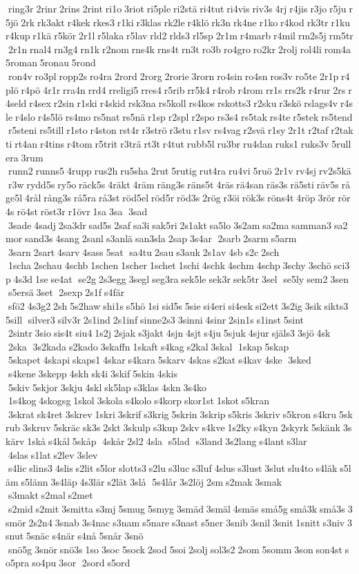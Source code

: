  ring3r 2rinr 2rins 2rint ri1o 3riot ri5ple ri2stä ri4tut ri4vis riv3s 4rj r4jis r3jo r5ju r5jö 2rk rk3akt r4kek rkes3 r1ki r3klas rk2le r4klö rk3n rk4ne r1ko r4kod rk3tr r1ku r4kup r1kä r5kör 2r1l r5laka r5lav rld2 rlds3 rl5sp 2r1m r4marb r4mil rm2s5j rm5tr 2r1n rnal4 rn3g4 rn1k r2nom rns4k rns4t rn3t ro3b ro4gro ro2kr 2rolj rol4li rom4a 5roman 5ronau 5rond  ron4v ro3pl ropp2s ro4ra 2rord 2rorg 2rorie 3rorn ro4sin ro4sn ros3v ro5te 2r1p r4plö r4pö 4r1r rra4n rrd4 rreligi5 rres4 r5rib rr5k4 r4rob r4rom rr1s rrs2k r4rur 2rs r4seld r4sex r2sin r1ski r4skid rsk3na rs5koll rs4kos rskotts3 r2sku r3skö rslags4v r4sle r4slo r4s5lö rs4mo rs5nat rs5nä r1sp r2spl r2spo rs3s4 rs5tak rs4te r5stek rs5tend r5steni rs5till r1sto r4ston rst4r r3strö r3stu r1sv rs4vag r2svä r1sy 2r1t r2taf r2takti rt4an r4tins r4tom r5trit r3trä rt3t r4tut rubb5l ru3br ru4dan ruks1 ruks3v 5rullera 3rum  runn2 runns5 4rupp rus2h ru5sha 2rut 5rutig rut4ra ru4vi 5ruö 2r1v rv4sj rv2s5kä r3w rydd5s ry5o räck5s 4räkt 4räm räng3s räns5t 4räs rä4san räs3s rä5sti räv5s råge5l 4rål rång3s rå5ra rå3st röd5el röd5r röd3s 2rög r3öi rök3s röns4t 4röp 3rör rör4s rö4st röst3r r1övr 1sa 3sa  3sad  3sade 4sadj 2sa3dr sad5s 2saf sa3i sak5ri 2s1akt sa5lo 3s2am sa2ma samman3 sa2mor sand3s 4sang 2sanl s3anlä san3sla 2sap 3s4ar  2sarb 2sarm s5arm  3sarn 2sart 4sarv 4sass 5sat  sa4tu 2sau s3auk 2s1av 4sb s2c 2sch  1scha 2schau 4schb 1schen 1scher 1schet 1schi 4schk 4schm 4schp 3schy 3schö sci3p 4s3d 1se se4at  se2g 2s3egg 3segl seg3ra sek5le sek3r sek5tr 3sel  se5ly sem2 3sen  s5ersä 3set  2sexp 2s1f s4fär  sfö2 4s3g2 2sh 5s2haw shi1s s5hö 1si sid5s 5sie si4eri si4esk si2ett 3s2ig 3sik sikts3 5sill  silver3 silv3r 2s1ind 2s1inf sinne2s3 3sinni 4sinr 2sin1s s1inst 5sint  2sintr 3sio sis4t siu4 1s2j 2sjak s3jakt 4sjn 4sjt s4ju 5sjuk 4sjur själs3 3sjö 4sk  2ska  3s2kada s2kado 3skaffn 1skaft s4kag s2kal 3skal  1skap 5skap  5skapet 4skapi skaps1 4skar s4kara 5skarv 4skas s2kat s4kav 4ske  3sked  s4kene 3skepp 4skh sk4i 3skif 5skin 4skis  5skiv 5skjor 3skju 4skl sk5lap s3klas 4skn 3s4ko  1s4kog 4skogsg 1skol 3skola s4kolo s4korp skor1st 1skot s5kran  3skrat sk4ret 3skrev 1skri 3skrif s3krig 5skrin 3skrip s5kris 3skriv s5kron s4kru 5skrub 3skruv 5skräc sk3s 2skt 3skulp s3kup 2skv s4kve 1s2ky s4kyn 2skyrk 5skänk 3skärv 1skå s4kål 5skåp  4skår 2sl2 4sla  s5lad  s3land 3s2lang s4lant s3lar  4slas s1lat s2lev 3slev  s4lic slins3 4slis s2lit s5lor slotts3 s2lu s3luc s3luf 4slus s3lust 3slut slu4to s4läk s5läm s5länn 3s4läp 4s3lär s2lät 3slå  5s4lår 3s2löj 2sm s2mak 3smak  s3makt s2mal s2met  s2mid s2mit 3smitta s3mj 5smug 5smyg 3smäd 3smäl 4smäs små5g små3k små3s 3smör 2s2n4 3snab 3s4nac s3nam s5nare s3nast s5ner 3snib 3snil 3snit 1snitt s3niv 3snut 5snäc s4när s4nå 5snår 3snö  snö5g 3snör snö3s 1so 3soc 5sock 2sod 5soi 2solj sol3s2 2som 5somm 3son son4st so5pra so4pu 3sor  2sord s5ord 